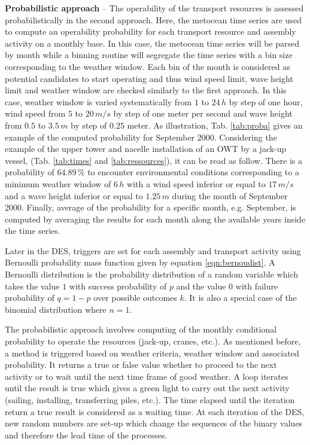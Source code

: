 \textbf{Probabilistic approach} -- The operability of the transport resources is assessed probabilistically in the second approach. Here, the metocean time series are used to compute an operability probability for each transport resource and assembly activity on a monthly base. In this case, the metocean time series will be parsed by month while a binning routine will segregate the time series with a bin size corresponding to the weather window. Each bin of the month is considered as potential candidates to start operating and thus wind speed limit, wave height limit and weather window are checked similarly to the first approach. In this case, weather window is varied systematically from $1$ to $24\, h$ by step of one hour, wind speed from $5$ to $20\, m/s$ by step of one meter per second and wave height from $0.5$ to $3.5\, m$ by step of $0.25$ meter. As illustration, Tab. \ref{tab:proba} gives an example of the computed probability for September 2000. Considering the example of the upper tower and nacelle installation of an OWT by a jack-up vessel, (Tab. \ref{tab:times} and \ref{tab:ressources}), it can be read as follow. There is a probability of $64.89\, \%$ to encounter environmental conditions corresponding to a minimum weather window of $6\, h$ with a wind speed inferior or equal to $17\, m/s$ and a wave height inferior or equal to $1.25\, m$ during the month of September 2000. Finally, average of the probability for a specific month, e.g. September, is computed by averaging the results for each month along the available years inside the time series.


Later in the DES, triggers are set for each assembly and transport activity using Bernoulli probability mass function given by equation \ref{eqn:bernoudist}. A Bernoulli distribution is the probability distribution of a random variable which takes the value $1$ with success probability of $p$ and the value $0$ with failure probability of $q=1-p$ over possible outcomes $k$. It is also a special case of the binomial distribution where $n=1$.

The probabilistic approach involves computing of the monthly conditional probability to operate the resources (jack-up, cranes, etc.). As mentioned before, a method is triggered based on weather criteria, weather window and associated probability. It returns a true or false value whether to proceed to the next activity or to wait until the next time frame of good weather. A loop iterates until the result is true which gives a green light to carry out the next activity (sailing, installing, transferring piles, etc.). The time elapsed until the iteration return a true result is considered as a waiting time. At each iteration of the DES, new random numbers are set-up which change the sequences of the binary values and therefore the lead time of the processes.

